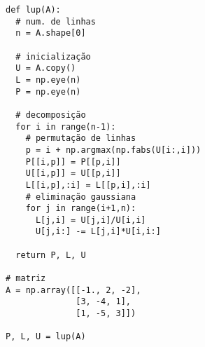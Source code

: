 \begin{ex}
\begin{lstlisting}[caption=lup.py, label=cap_sislin_sec_lu:cod:lup]
def lup(A):
  # num. de linhas
  n = A.shape[0]

  # inicialização
  U = A.copy()
  L = np.eye(n)
  P = np.eye(n)

  # decomposição
  for i in range(n-1):
    # permutação de linhas
    p = i + np.argmax(np.fabs(U[i:,i]))
    P[[i,p]] = P[[p,i]]
    U[[i,p]] = U[[p,i]]
    L[[i,p],:i] = L[[p,i],:i]
    # eliminação gaussiana
    for j in range(i+1,n):
      L[j,i] = U[j,i]/U[i,i]
      U[j,i:] -= L[j,i]*U[i,i:]

  return P, L, U

# matriz
A = np.array([[-1., 2, -2],
              [3, -4, 1],
              [1, -5, 3]])

P, L, U = lup(A)
\end{lstlisting}

\end{ex}

